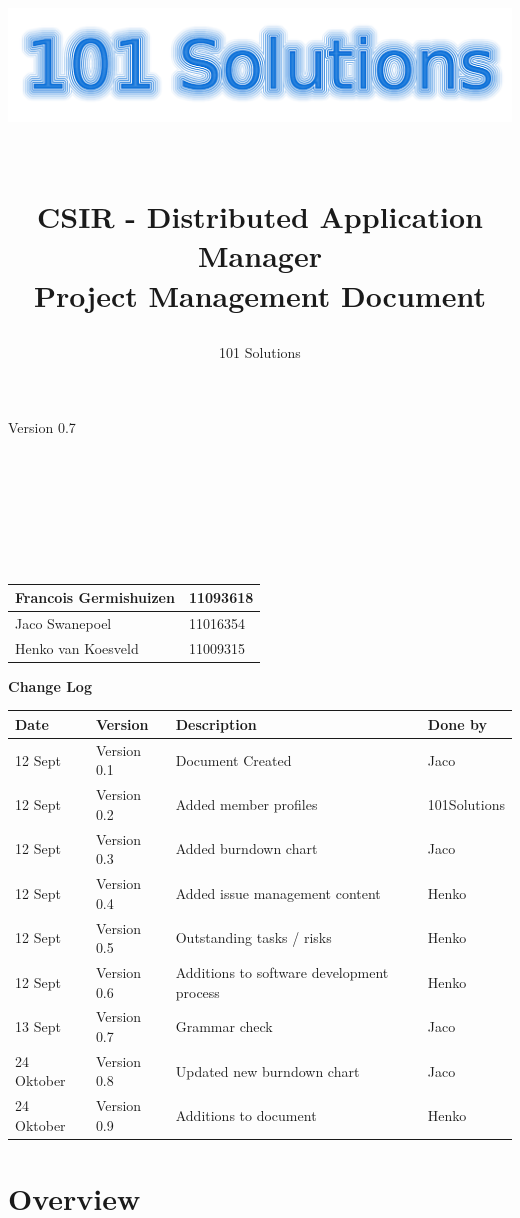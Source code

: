 \documentclass[a4paper,12pt,final]{article}
\title{
\begin{center}
  	\includegraphics[scale=0.3]{101Logo.png} 
  \end{center}
  \textbf{\\}
CSIR - Distributed Application Manager\\
Project Management Document\\
}
\author{101 Solutions}
\begin{document}
\maketitle
\begin{center}
Version 0.7
\end{center}
\textbf{\\}
\textbf{\\}
\textbf{\\}
\textbf{\\}
\textbf{\\}
\textbf{\\}
\begin{center}
\begin{tabular}{|l|l|}
\hline
Francois Germishuizen & 11093618\\
\hline
Jaco Swanepoel & 11016354\\
\hline
Henko van Koesveld & 11009315\\
\hline
\end{tabular}
\end{center}
\thispagestyle{empty}
\newpage
\thispagestyle{empty}
\textbf{\large{Change Log}}
\vspace{6pt}\newline
\begin{tabular}{|l|l|l|l|}
\hline
\textbf{Date} & \textbf{Version} & \textbf{Description} & \textbf{Done by}\\
\hline
12 Sept & Version 0.1 & Document Created & Jaco\\
\hline
12 Sept & Version 0.2 & Added member profiles & 101Solutions\\
\hline
12 Sept & Version 0.3 & Added burndown chart & Jaco\\
\hline
12 Sept & Version 0.4 & Added issue management content & Henko\\
\hline
12 Sept & Version 0.5 & Outstanding tasks / risks & Henko\\
\hline
12 Sept & Version 0.6 & Additions to  software development process & Henko\\
\hline
13 Sept & Version 0.7 & Grammar check & Jaco\\
\hline
24 Oktober & Version 0.8 & Updated new burndown chart & Jaco\\
\hline
24 Oktober & Version 0.9 & Additions to document & Henko\\
\hline
\end{tabular}
\newpage
\tableofcontents
\thispagestyle{empty}
\newpage

\section{Overview}
\end{document}
